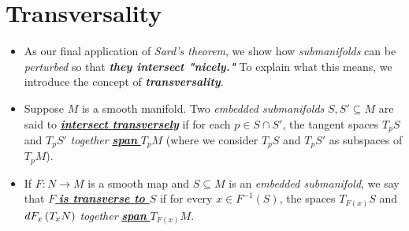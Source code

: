 \documentclass[11pt]{article}
\begin{document}
\section{Transversality}
\begin{itemize}
\item As our final application of \emph{Sard's theorem}, we show how \emph{submanifolds} can be \emph{perturbed} so that \emph{\textbf{they intersect "nicely."}} To explain what this means, we introduce the concept of \emph{\textbf{transversality}}.

\item \begin{definition}
Suppose $M$ is a smooth manifold. Two \emph{embedded submanifolds} $S, S' \subseteq M$ are said to \underline{\emph{\textbf{intersect transversely}}} if for each $p \in S \cap S'$, the tangent spaces \underline{$T_{p}S$} and \underline{$T_{p}S'$} \emph{together} \underline{\emph{\textbf{span}} $T_{p}M$} (where we consider $T_{p}S$ and $T_{p}S'$ as subspaces of $T_{p}M$).
\end{definition}

\item \begin{definition}
If $F: N \rightarrow M$ is a smooth map and $S \subseteq M$ is an \emph{embedded submanifold}, we say that \underline{$F$ \emph{\textbf{is transverse to $S$}}} if for every $x \in F^{-1}(S)$, the spaces \underline{$T_{F(x)}S$} and \underline{$dF_{x}\left(T_{x}N\right)$} \emph{together} \underline{\emph{\textbf{span}} $T_{F(x)}M$}.
\end{definition}
\end{itemize}




\newpage


\end{document}
